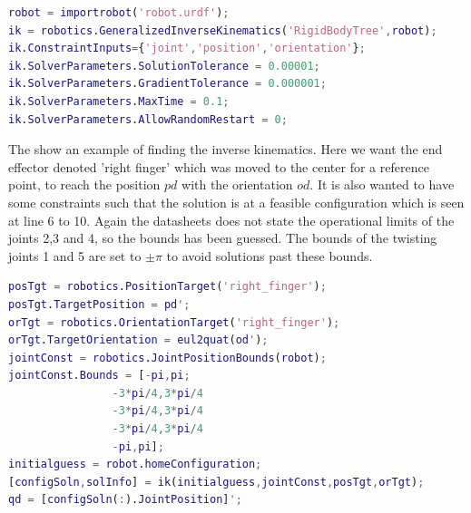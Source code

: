 \begin{lstlisting}[caption={MATLAB code of creating a invrerse kinematics},label={lst:robotinit},language=Matlab]
robot = importrobot('robot.urdf');
ik = robotics.GeneralizedInverseKinematics('RigidBodyTree',robot);
ik.ConstraintInputs={'joint','position','orientation'};
ik.SolverParameters.SolutionTolerance = 0.00001;
ik.SolverParameters.GradientTolerance = 0.000001;
ik.SolverParameters.MaxTime = 0.1;
ik.SolverParameters.AllowRandomRestart = 0;
\end{lstlisting}

The  show an example of finding the inverse kinematics. Here we want the end effector denoted 'right finger' which was moved to the center for a reference point, to reach the position $pd$ with the orientation $od$. It is also wanted to have some constraints such that the solution is at a feasible configuration which is seen at line 6 to 10. Again the datasheets does not state the operational limits of the joints 2,3 and 4, so the bounds has been guessed. The bounds of the twisting joints 1 and 5 are set to $\pm \pi$ to avoid solutions past these bounds. 

\begin{lstlisting}[caption={MATLAB code of creating a inverse kinematics},label={lst:gik},language=Matlab]
posTgt = robotics.PositionTarget('right_finger');
posTgt.TargetPosition = pd';
orTgt = robotics.OrientationTarget('right_finger');
orTgt.TargetOrientation = eul2quat(od');
jointConst = robotics.JointPositionBounds(robot);
jointConst.Bounds = [-pi,pi;
                -3*pi/4,3*pi/4
                -3*pi/4,3*pi/4
                -3*pi/4,3*pi/4
                -pi,pi];
initialguess = robot.homeConfiguration;
[configSoln,solInfo] = ik(initialguess,jointConst,posTgt,orTgt);
qd = [configSoln(:).JointPosition]';
\end{lstlisting}














































